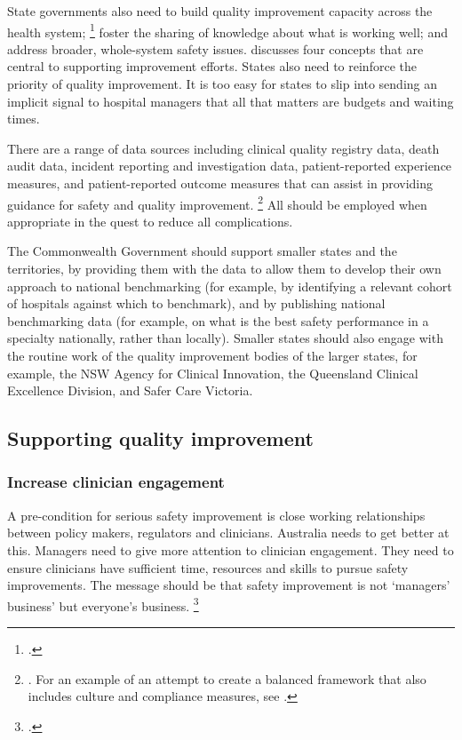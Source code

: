 \documentclass[FrontPage]{grattan}
\begin{document}
State governments also need to build quality improvement capacity across the health system;%
	\footcite{mery2017evaluating}
foster the sharing of knowledge about what is working well; and address broader, whole-system safety issues.
 discusses four concepts that are central to supporting improvement efforts.
States also need to reinforce the priority of quality improvement.
It is too easy for states to slip into sending an implicit signal to hospital managers that all that matters are budgets and waiting times.

There are a range of data sources including clinical quality registry data, death audit data, incident reporting and investigation data, patient-reported experience measures, and patient-reported outcome measures that can assist in providing guidance for safety and quality improvement.%
	\footnote{\textcite{DuckettEtAl-2017-Strengthening-safety-statistics}. 
	For an example of an attempt to create a balanced framework that also includes culture and compliance measures, see \textcite{Wakefield_2009}.}
All should be employed when appropriate in the quest to reduce all complications.

The Commonwealth Government should support smaller states and the territories, by providing them with the data to allow them to develop their own approach to national benchmarking (for example, by identifying a relevant cohort of hospitals against which to benchmark), and by publishing national benchmarking data (for example, on what is the best safety performance in a specialty nationally, rather than locally).
Smaller states should also engage with the routine work of the quality improvement bodies of the larger states, for example, the NSW Agency for Clinical Innovation, the Queensland Clinical Excellence Division, and Safer Care Victoria.

\subsection{Supporting quality improvement}\label{subsec:quality-improve}

\subsubsection{Increase clinician engagement}

A pre-condition for serious safety improvement is close working relationships between policy makers, regulators and clinicians.
Australia needs to get better at this. Managers need to give more attention to clinician engagement.
They need to ensure clinicians have sufficient time, resources and skills to pursue safety improvements.
The message should be that safety improvement is not `managers' business' but everyone's business.%
	\footcites{Duckett-Review-2016-Quality-assurance-in-Vic}{Jorm-2017-Clinical-engagement}{Alderwick-etal-2017-Making-case-for-quality-improvement-lessons-for-NHS-boards}
\end{document}
